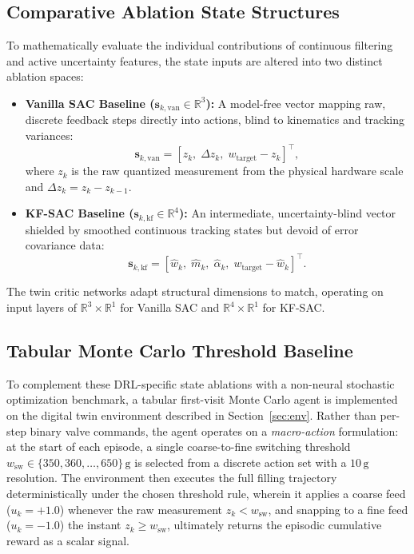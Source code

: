 \documentclass[conference]{IEEEtran}
\begin{document}
\subsection{Comparative Ablation State Structures}
To mathematically evaluate the individual contributions of continuous filtering and active uncertainty features, the state inputs are altered into two distinct ablation spaces:
\begin{itemize}
    \item \textbf{Vanilla SAC Baseline ($\mathbf{s}_{k,\text{van}} \in \mathbb{R}^3$):} A model-free vector mapping raw, discrete feedback steps directly into actions, blind to kinematics and tracking variances:
    \begin{equation}
        \mathbf{s}_{k,\text{van}} = \left[z_k,\; \Delta z_k,\; w_{\text{target}} - z_k\right]^\top,
    \end{equation}
    where $z_k$ is the raw quantized measurement from the physical hardware scale and $\Delta z_k = z_k - z_{k-1}$.
    \item \textbf{KF-SAC Baseline ($\mathbf{s}_{k,\text{kf}} \in \mathbb{R}^4$):} An intermediate, uncertainty-blind vector shielded by smoothed continuous tracking states but devoid of error covariance data:
    \begin{equation}
        \mathbf{s}_{k,\text{kf}} = \left[\hat{w}_k,\; \hat{m}_k,\; \hat{\alpha}_k,\; w_{\text{target}} - \hat{w}_k\right]^\top.
    \end{equation}
\end{itemize}
The twin critic networks adapt structural dimensions to match, operating on input layers of $\mathbb{R}^3 \times \mathbb{R}^1$ for Vanilla SAC and $\mathbb{R}^4 \times \mathbb{R}^1$ for KF-SAC.

\subsection{Tabular Monte Carlo Threshold Baseline}
\label{sec:mc}

To complement these DRL-specific state ablations with a non-neural stochastic optimization benchmark, a tabular first-visit Monte Carlo agent is implemented on the digital twin environment described in Section~\ref{sec:env}. Rather than per-step binary valve commands, the agent operates on a \emph{macro-action} formulation: at the start of each episode, a single coarse-to-fine switching threshold $w_\text{sw} \in \{350, 360, \ldots, 650\}\,\text{g} $ is selected from a discrete action set with a $10\,\text{g}$ resolution. The environment then executes the full filling trajectory deterministically under the chosen threshold rule, wherein it applies a coarse feed ($u_k = +1.0$) whenever the raw measurement $z_k < w_\text{sw}$, and snapping to a fine feed ($u_k = -1.0$) the instant $z_k \ge w_\text{sw}$, ultimately returns the episodic cumulative reward as a scalar signal.
\end{document}
